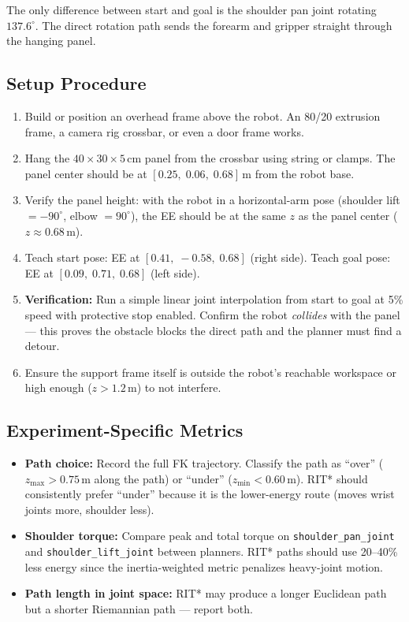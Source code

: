 \documentclass[11pt]{article}
\begin{document}
The only difference between start and goal is the shoulder pan joint rotating $137.6^\circ$. The direct rotation path sends the forearm and gripper straight through the hanging panel.

\subsection{Setup Procedure}

\begin{enumerate}[itemsep=2pt]
  \item Build or position an overhead frame above the robot. An 80/20 extrusion frame, a camera rig crossbar, or even a door frame works.
  \item Hang the $40 \times 30 \times 5$\,cm panel from the crossbar using string or clamps. The panel center should be at $[0.25,\; 0.06,\; 0.68]$\,m from the robot base.
  \item Verify the panel height: with the robot in a horizontal-arm pose (shoulder lift $= -90^\circ$, elbow $= 90^\circ$), the EE should be at the same $z$ as the panel center ($z \approx 0.68$\,m).
  \item Teach start pose: EE at $[0.41,\; -0.58,\; 0.68]$ (right side). Teach goal pose: EE at $[0.09,\; 0.71,\; 0.68]$ (left side).
  \item \textbf{Verification:} Run a simple linear joint interpolation from start to goal at 5\% speed with protective stop enabled. Confirm the robot \emph{collides} with the panel --- this proves the obstacle blocks the direct path and the planner must find a detour.
  \item Ensure the support frame itself is outside the robot's reachable workspace or high enough ($z > 1.2$\,m) to not interfere.
\end{enumerate}

\subsection{Experiment-Specific Metrics}
\begin{itemize}[itemsep=2pt]
  \item \textbf{Path choice:} Record the full FK trajectory. Classify the path as ``over'' ($z_\text{max} > 0.75$\,m along the path) or ``under'' ($z_\text{min} < 0.60$\,m). RIT* should consistently prefer ``under'' because it is the lower-energy route (moves wrist joints more, shoulder less).
  \item \textbf{Shoulder torque:} Compare peak and total torque on \texttt{shoulder\_pan\_joint} and \texttt{shoulder\_lift\_joint} between planners. RIT* paths should use 20--40\% less energy since the inertia-weighted metric penalizes heavy-joint motion.
  \item \textbf{Path length in joint space:} RIT* may produce a longer Euclidean path but a shorter Riemannian path --- report both.
\end{itemize}
\end{document}
